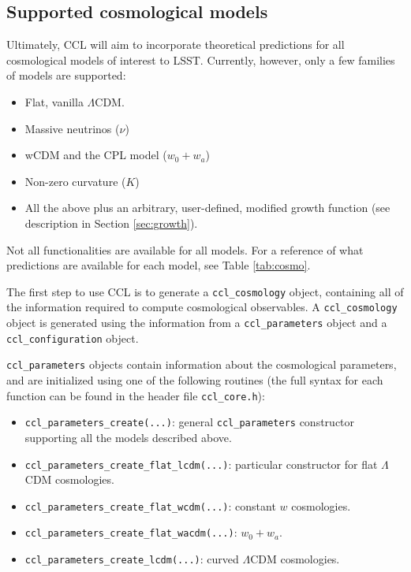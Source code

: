\documentclass[\docopts]{\docclass}
\begin{document}
\subsection{Supported cosmological models}
\label{sec:cosmologies}
Ultimately, CCL will aim to incorporate theoretical predictions for all cosmological models of interest to LSST. Currently, however, only a few families of models are supported:
\begin{itemize}
 \item Flat, vanilla $\Lambda$CDM.
 \item Massive neutrinos ($\nu$)
 \item wCDM and the CPL model ($w_0+w_a$)
 \item Non-zero curvature ($K$)
 \item All the above plus an arbitrary, user-defined, modified growth function (see description in Section \ref{sec:growth}).
\end{itemize}

Not all functionalities are available for all models. For a reference of what 
predictions are available for each model, see Table \ref{tab:cosmo}.

The first step to use CCL is to generate a {\tt ccl\_cosmology} object, containing all of the information required to compute cosmological observables. A {\tt ccl\_cosmology} object is generated using the information from a {\tt ccl\_parameters} object and a {\tt ccl\_configuration} object. 

\label{tab:cosmo}

{\tt ccl\_parameters} objects contain information about the cosmological parameters, and are initialized using one of the following routines (the full syntax for each function can be found in the header file {\tt ccl\_core.h}):
\begin{itemize}
 \item {\tt ccl\_parameters\_create(...)}: general {\tt ccl\_parameters} constructor supporting all the models described above.
 \item {\tt ccl\_parameters\_create\_flat\_lcdm(...)}: particular constructor for flat $\Lambda$CDM cosmologies.
 \item {\tt ccl\_parameters\_create\_flat\_wcdm(...)}: constant $w$ cosmologies.
 \item {\tt ccl\_parameters\_create\_flat\_wacdm(...)}: $w_0+w_a$.
 \item {\tt ccl\_parameters\_create\_lcdm(...)}: curved $\Lambda$CDM cosmologies.
\end{itemize}
\end{document}
